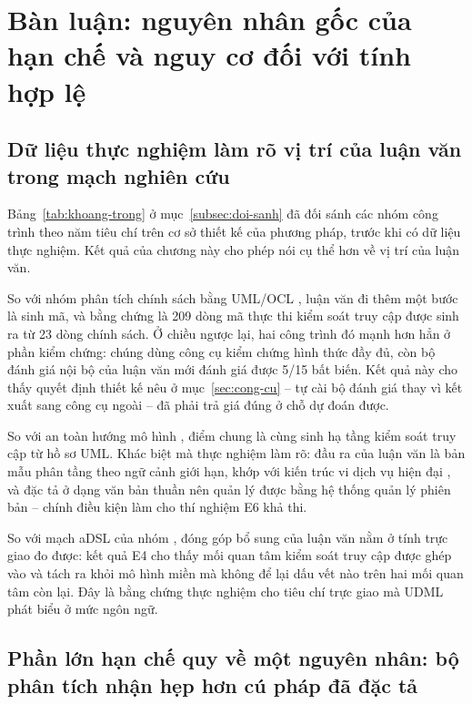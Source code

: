 \section{Bàn luận: nguyên nhân gốc của hạn chế và nguy cơ đối với tính hợp lệ}
\label{sec:ban-luan}

\subsection{Dữ liệu thực nghiệm làm rõ vị trí của luận văn trong mạch nghiên cứu}

Bảng~\ref{tab:khoang-trong} ở mục~\ref{subsec:doi-sanh} đã đối sánh các nhóm công trình theo năm tiêu chí trên cơ sở thiết kế của phương pháp, trước khi có dữ liệu thực nghiệm. Kết quả của chương này cho phép nói cụ thể hơn về vị trí của luận văn.

So với nhóm phân tích chính sách bằng UML/OCL \citep{ray2004,sohr2008}, luận văn đi thêm một bước là sinh mã, và bằng chứng là 209 dòng mã thực thi kiểm soát truy cập được sinh ra từ 23 dòng chính sách. Ở chiều ngược lại, hai công trình đó mạnh hơn hẳn ở phần kiểm chứng: chúng dùng công cụ kiểm chứng hình thức đầy đủ, còn bộ đánh giá nội bộ của luận văn mới đánh giá được 5/15 bất biến. Kết quả này cho thấy quyết định thiết kế nêu ở mục~\ref{sec:cong-cu} -- tự cài bộ đánh giá thay vì kết xuất sang công cụ ngoài -- đã phải trả giá đúng ở chỗ dự đoán được.

So với an toàn hướng mô hình \citep{lodderstedt2002,basin2006}, điểm chung là cùng sinh hạ tầng kiểm soát truy cập từ hồ sơ UML. Khác biệt mà thực nghiệm làm rõ: đầu ra của luận văn là bản mẫu phân tầng theo ngữ cảnh giới hạn, khớp với kiến trúc vi dịch vụ hiện đại \citep{le2025tmsa,richardson2018}, và đặc tả ở dạng văn bản thuần nên quản lý được bằng hệ thống quản lý phiên bản -- chính điều kiện làm cho thí nghiệm E6 khả thi.

So với mạch aDSL của nhóm \citep{le2018dcsl,dang2023agl,le2025udml}, đóng góp bổ sung của luận văn nằm ở tính trực giao đo được: kết quả E4 cho thấy mối quan tâm kiểm soát truy cập được ghép vào và tách ra khỏi mô hình miền mà không để lại dấu vết nào trên hai mối quan tâm còn lại. Đây là bằng chứng thực nghiệm cho tiêu chí trực giao mà UDML \citep{le2025udml} phát biểu ở mức ngôn ngữ.

\subsection{Phần lớn hạn chế quy về một nguyên nhân: bộ phân tích nhận hẹp hơn cú pháp đã đặc tả}
\label{subsec:nguyen-nhan-goc}

